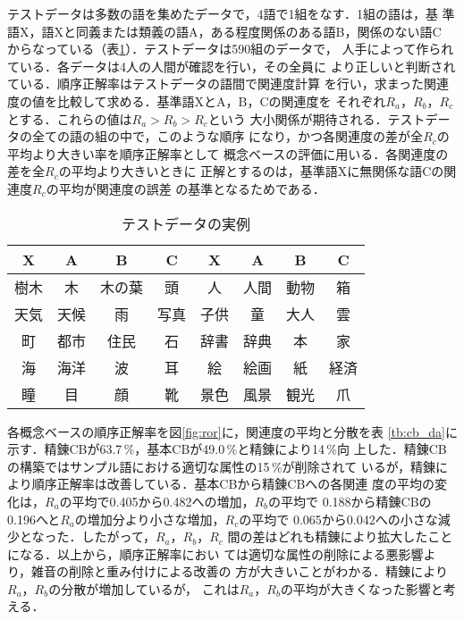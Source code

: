 テストデータは多数の語を集めたデータで，4語で1組をなす．1組の語は，基
準語X，語Xと同義または類義の語A，ある程度関係のある語B，関係のない語C
からなっている（表\ref{tb:ex_measure}）．テストデータは590組のデータで，
人手によって作られている．各データは4人の人間が確認を行い，その全員に
より正しいと判断されている．順序正解率はテストデータの語間で関連度計算
を行い，求まった関連度の値を比較して求める．基準語XとA，B，Cの関連度を
それぞれ$R_a$，$R_b$，$R_c$とする．これらの値は$R_a > R_b > R_c$という
大小関係が期待される．テストデータの全ての語の組の中で，このような順序
になり，かつ各関連度の差が全$R_c$の平均より大きい率を順序正解率として
概念ベースの評価に用いる．各関連度の差を全$R_c$の平均より大きいときに
正解とするのは，基準語Xに無関係な語Cの関連度$R_c$の平均が関連度の誤差
の基準となるためである．

\begin{table}[ht]
  \begin{center}
    \caption{テストデータの実例}
    \label{tb:ex_measure}
    \begin{tabular}{cccc|cccc}
      \hline
      X & A & B & C & X & A & B & C \\
      \hline
      樹木 & 木 & 木の葉 & 頭 & 人 & 人間 & 動物 & 箱 \\
      天気 & 天候 & 雨 & 写真 & 子供 & 童 & 大人 & 雲 \\
      町 & 都市 & 住民 & 石 & 辞書 & 辞典 & 本 & 家 \\
      海 & 海洋 & 波 & 耳 & 絵 & 絵画 & 紙 & 経済 \\
      瞳 & 目 & 顔 & 靴 & 景色 & 風景 & 観光 & 爪 \\
      \hline
    \end{tabular}
  \end{center}
\end{table}

各概念ベースの順序正解率を図\ref{fig:ror}に，関連度の平均と分散を表
\ref{tb:cb_da}に示す．精錬CBが63.7\,\%，基本CBが49.0\,\%と精錬により14\,\%向
上した．精錬CBの構築ではサンプル語における適切な属性の15\,\%が削除されて
いるが，精錬により順序正解率は改善している．基本CBから精錬CBへの各関連
度の平均の変化は，$R_a$の平均で0.405から0.482への増加，$R_b$の平均で
0.188から精錬CBの0.196へと$R_a$の増加分より小さな増加，$R_c$の平均で
0.065から0.042への小さな減少となった．したがって，$R_a$，$R_b$，$R_c$
間の差はどれも精錬により拡大したことになる．以上から，順序正解率におい
ては適切な属性の削除による悪影響より，雑音の削除と重み付けによる改善の
方が大きいことがわかる．精錬により$R_a$，$R_b$の分散が増加しているが，
これは$R_a$，$R_b$の平均が大きくなった影響と考える．

